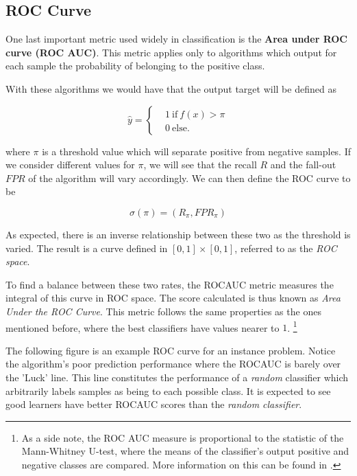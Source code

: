 \begin{itemize}
\end{itemize}



\subsection{ROC Curve}

One last important metric used widely in classification is the \textbf{Area under ROC curve (ROC AUC)}. This metric applies only to algorithms which output for each sample the probability of belonging to the positive class. 

With these algorithms we would have that the output target will be defined as

\begin{equation}
\hat{y} =
\begin{cases}
&1 \ \mbox{if} \ f(x) > \pi \\
&0 \ \mbox{else}.
\end{cases}
\end{equation}

where $\pi$ is a threshold value which will separate positive from negative samples. If we consider different values for $\pi$, we will see that the recall $R$ and the fall-out $FPR$ of the algorithm will vary accordingly. We can then define the ROC curve to be 

\begin{equation}
\sigma(\pi) = (R_\pi, FPR_\pi)
\end{equation}

As expected, there is an inverse relationship between these two as the threshold is varied. The result is a curve defined in $[0,1]\times[0,1]$, referred to as the \textit{ROC space}.

To find a balance between these two rates, the ROCAUC metric measures the integral of this curve in ROC space. The score calculated is thus known as \textit{Area Under the ROC Curve}. This metric follows the same properties as the ones mentioned before, where the best classifiers have values nearer to $1$. \footnote{As a side note, the ROC AUC measure is proportional to the statistic of the Mann-Whitney U-test, where the means of the classifier's output positive and negative classes are compared. More information on this can be found in \textcite{mason-rocAucRelationship}.}



The following figure is an example ROC curve for an instance problem. Notice the algorithm's poor prediction performance where the ROCAUC is barely over the 'Luck' line. This line constitutes the performance of a \textit{random} classifier which arbitrarily labels samples as being to each possible class. It is expected to see good learners have better ROCAUC scores than the \textit{random classifier}.

